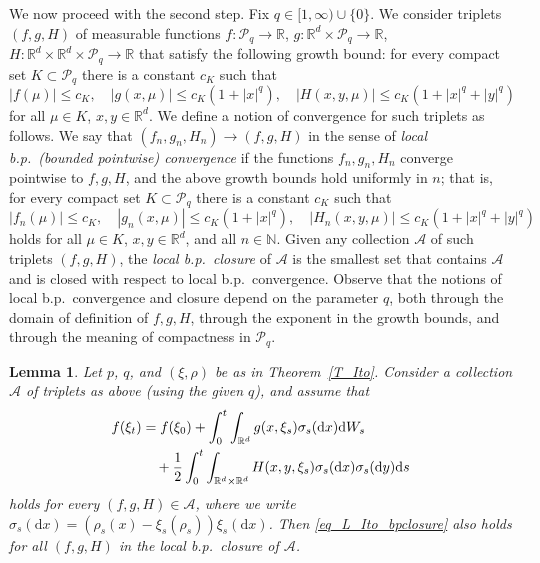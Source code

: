 \documentclass{article}
\newtheorem{lemma}[theorem]{Lemma}
\theoremstyle{definition}
\numberwithin{equation}{section}
\numberwithin{theorem}{section}
\newcommand{\R}{\mathbb{R}}
\newcommand{\dx}{\mathrm{d}x}
\newcommand{\dy}{\mathrm{d}y}
\newcommand{\ds}{\mathrm{d}s}
\renewcommand{\d}{{\rm d}}
\newcommand{\N}{{\mathbb N}}
\newcommand{\Acal}{{\mathcal A}}
\newcommand{\Pcal}{{\mathcal P}}
\begin{document}
We now proceed with the second step. Fix $q \in [1,\infty) \cup \{0\}$. We consider triplets $(f,g,H)$ of measurable functions $f\colon\Pcal_q\to\R$, $g\colon {\R^d}\times\Pcal_q\to\R$, $H\colon {\R^d}\times {\R^d}\times\Pcal_q\to\R$ that satisfy the following growth bound: for every compact set $K \subset \Pcal_q$ there is a constant $c_K$ such that
\[
|f(\mu)| \le c_K, \quad | g(x,\mu) | \le c_K (1 + |x|^q), \quad | H(x,y,\mu) | \le c_K (1 + |x|^q + |y|^q)
\]
for all $\mu \in K$, $x,y \in {\R^d}$. We define a notion of convergence for such triplets as follows. We say that $(f_n,g_n,H_n)\to(f,g,H)$ in the sense of \emph{local b.p.~(bounded pointwise) convergence} if the functions $f_n,g_n,H_n$ converge pointwise to $f,g,H$, and the above growth bounds hold uniformly in $n$; that is, for every compact set $K \subset \Pcal_q$ there is a constant $c_K$ such that
\[
|f_n(\mu)| \le c_K, \quad | g_n(x,\mu) | \le c_K (1 + |x|^q), \quad | H_n(x,y,\mu) | \le c_K (1 + |x|^q + |y|^q)
\]
holds for all $\mu \in K$, $x,y \in {\R^d}$, and all $n \in \N$. Given any collection $\Acal$ of such triplets $(f,g,H)$, the \emph{local b.p.~closure} of $\Acal$ is the smallest set that contains $\Acal$ and is closed with respect to local b.p.~convergence. Observe that the notions of local b.p.~convergence and closure depend on the parameter $q$, both through the domain of definition of $f,g,H$, through the exponent in the growth bounds, and through the meaning of compactness in $\Pcal_q$.

\begin{lemma}\label{L_Ito_bpclosure}
Let $p$, $q$, and $(\xi,\rho)$ be as in Theorem~\ref{T_Ito}. Consider a collection $\Acal$ of triplets as above (using the given $q$), and assume that
\begin{equation}\label{eq_L_Ito_bpclosure}
\begin{aligned}
f(\xi_t) &= f(\xi_0) + \int_0^t \int_{\R^d} g(x,\xi_s)\sigma_s(\dx) \d W_s \\
&\quad + \frac12 \int_0^t \int_{{\R^d}\times {\R^d}} H(x,y,\xi_s)\sigma_s(\dx)\sigma_s(\dy) \ds
\end{aligned}
\end{equation}
holds for every $(f,g,H)\in\Acal$, where we write $\sigma_s(\dx)=(\rho_s(x)-\xi_s(\rho_s))\xi_s(\dx)$. Then \eqref{eq_L_Ito_bpclosure} also holds for all $(f,g,H)$ in the local b.p.~closure of $\Acal$.
\end{lemma}
\end{document}
